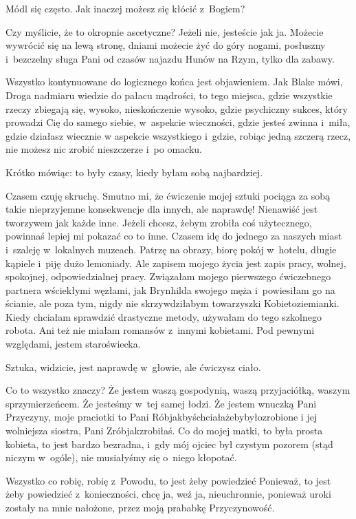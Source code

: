 \documentclass[oneside,polish,12pt,sfheadings]{mwbk}
\begin{document}
Módl się często. Jak inaczej możesz się kłócić z~Bogiem?

Czy myślicie, że to okropnie ascetyczne? Jeżeli nie, jesteście jak
ja. Możecie wywrócić się na lewą stronę, dniami możecie żyć do góry
nogami, posłuszny i~bezczelny sługa Pani od czasów najazdu Hunów na
Rzym, tylko dla zabawy.

Wszystko kontynuowane do logicznego końca jest objawieniem. Jak Blake
mówi, Droga nadmiaru wiedzie do pałacu mądrości, to tego miejsca,
gdzie wszystkie rzeczy zbiegają się, wysoko, nieskończenie wysoko,
gdzie psychiczny sukces, który prowadzi Cię do samego siebie, w~aspekcie
wieczności, gdzie jesteś zwinna i~miła, gdzie działasz wiecznie w
aspekcie wszystkiego i~gdzie, robiąc jedną szczerą rzecz, nie możesz
nic zrobić nieszczerze i~po omacku.

Krótko mówiąc: to były czasy, kiedy byłam sobą najbardziej.

Czasem czuję skruchę. Smutno mi, że ćwiczenie mojej sztuki pociąga
za sobą takie nieprzyjemne konsekwencje dla innych, ale naprawdę!
Nienawiść jest tworzywem jak każde inne. Jeżeli chcesz, żebym zrobiła
coś użytecznego, powinnaś lepiej mi pokazać co to inne. Czasem idę
do jednego za naszych miast i~szaleję w~lokalnych muzeach. Patrzę
na obrazy, biorę pokój w~hotelu, długie kąpiele i~piję dużo lemoniady.
Ale zapisem mojego życia jest zapis pracy, wolnej, spokojnej, odpowiedzialnej
pracy. Związałam mojego pierwszego ćwiczebnego partnera wściekłymi
węzłami, jak Brynhilda swojego męża i~powiesiłam go na ścianie, ale
poza tym, nigdy nie skrzywdziłabym towarzyszki Kobietoziemianki. Kiedy
chciałam sprawdzić drastyczne metody, używałam do tego szkolnego robota.
Ani też nie miałam romansów z~innymi kobietami. Pod pewnymi względami,
jestem staroświecka.

Sztuka, widzicie, jest naprawdę w~głowie, ale ćwiczysz ciało.

Co to wszystko znaczy? Że jestem waszą gospodynią, waszą przyjaciółką,
waszym sprzymierzeńcem. Że jesteśmy w~tej samej łodzi. Że jestem wnuczką
Pani Przyczyny, moje praciotki to Pani Róbjakbyśchciałażebybyłozrobione
i jej wolniejsza siostra, Pani Zróbjakzrobiłaś. Co do mojej matki,
to była prosta kobieta, to jest bardzo bezradna, i~gdy mój ojciec
był czystym pozorem (stąd niczym w~ogóle), nie musiałyśmy się o~niego
kłopotać.

Wszystko co robię, robię z~Powodu, to jest żeby powiedzieć Ponieważ,
to jest żeby powiedzieć z~konieczności, chcę ja, weź ja, nieuchronnie,
ponieważ uroki zostały na mnie nałożone, przez moją prababkę Przyczynowość.
\end{document}
